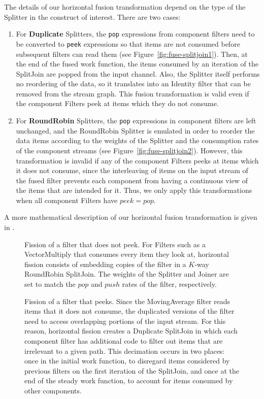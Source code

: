 The details of our horizontal fusion transformation depend on the type
of the Splitter in the construct of interest.  There are two cases:
\begin{enumerate}
\item For {\bf Duplicate} Splitters, the {\tt pop} expressions from
component filters need to be converted to {\tt peek} expressions so
that items are not consumed before subsequent filters can read them
(see Figure~\ref{fig:fuse-splitjoin1}).  Then, at the end of the fused
work function, the items consumed by an iteration of the SplitJoin are
popped from the input channel.  Also, the Splitter itself performs no
reordering of the data, so it translates into an Identity filter that
can be removed from the stream graph.  This fusion transformation is
valid even if the component Filters peek at items which they do not
consume.

\item For {\bf RoundRobin} Splitters, the {\tt pop} expressions in
component filters are left unchanged, and the RoundRobin Splitter is
emulated in order to reorder the data items according to the weights
of the Splitter and the consumption rates of the component streams
(see Figure~\ref{fig:fuse-splitjoin2}).  However, this transformation
is invalid if any of the component Filters peeks at items which it
does not consume, since the interleaving of items on the input stream
of the fused filter prevents each component from having a continuous
view of the items that are intended for it.  Thus, we only apply this
transformations when all component Filters have $peek = pop$.
\end{enumerate}

A more mathematical description of our horizontal fusion
transformation is given in \cite{streamittech2}.

\begin{figure}
\centering
{}
\caption{\protect\small Fission of a filter that does not peek.  For
Filters such as a VectorMultiply that consumes every item they look
at, horizontal fission consists of embedding copies of the filter in a
$K$-way RoundRobin SplitJoin.  The weights of the Splitter and Joiner
are set to match the $pop$ and $push$ rates of the filter,
respectively.  \protect\label{fig:fission-nopeek}}
\vspace{18pt}
\caption{\protect\small Fission of a filter that peeks.  Since the
MovingAverage filter reads items that it does not consume, the
duplicated versions of the filter need to access overlapping portions
of the input stream.  For this reason, horizontal fission creates a
Duplicate SplitJoin in which each component filter has additional code
to filter out items that are irrelevant to a given path.  This
decimation occurs in two places: once in the initial work function, to
disregard items considered by previous filters on the first iteration
of the SplitJoin, and once at the end of the steady work function, to
account for items consumed by other components.
\protect\label{fig:fission-peek}}
\end{figure}

